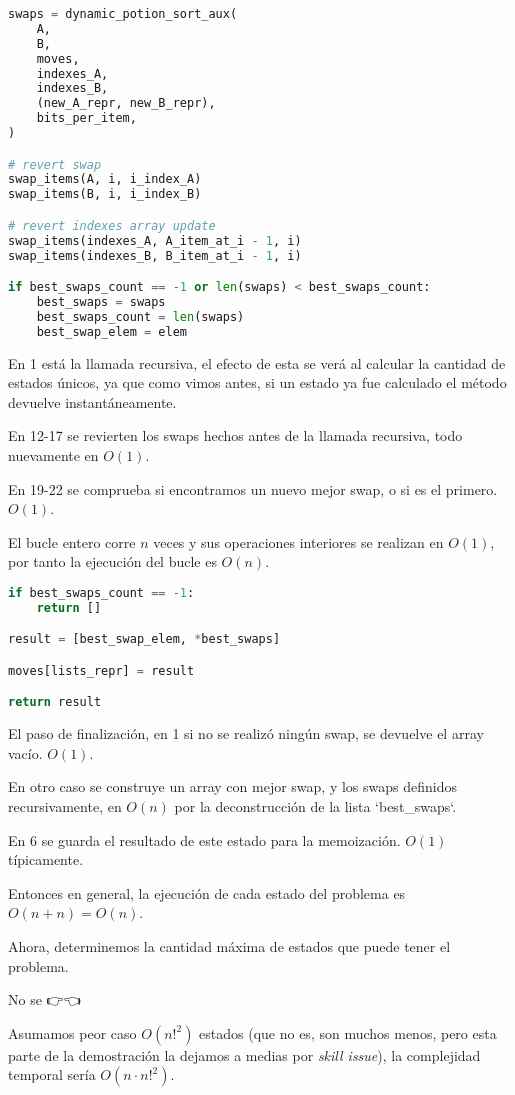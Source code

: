 \documentclass{article}
\begin{document}
\begin{lstlisting}[language=Python]
swaps = dynamic_potion_sort_aux(
    A,
    B,
    moves,
    indexes_A,
    indexes_B,
    (new_A_repr, new_B_repr),
    bits_per_item,
)

# revert swap
swap_items(A, i, i_index_A)
swap_items(B, i, i_index_B)

# revert indexes array update
swap_items(indexes_A, A_item_at_i - 1, i)
swap_items(indexes_B, B_item_at_i - 1, i)

if best_swaps_count == -1 or len(swaps) < best_swaps_count:
    best_swaps = swaps
    best_swaps_count = len(swaps)
    best_swap_elem = elem
\end{lstlisting}

En 1 está la llamada recursiva, el efecto de esta se verá al calcular la cantidad de estados únicos, ya que como vimos antes, si un estado ya fue calculado el método devuelve instantáneamente.

En 12-17 se revierten los swaps hechos antes de la llamada recursiva, todo nuevamente en $O(1)$.

En 19-22 se comprueba si encontramos un nuevo mejor swap, o si es el primero. $O(1)$.

El bucle entero corre $n$ veces y sus operaciones interiores se realizan en $O(1)$, por tanto la ejecución del bucle es $O(n)$.

\begin{lstlisting}[language=Python]
if best_swaps_count == -1:
    return []

result = [best_swap_elem, *best_swaps]

moves[lists_repr] = result

return result
\end{lstlisting}

El paso de finalización, en 1 si no se realizó ningún swap, se devuelve el array vacío. $O(1)$.

En otro caso se construye un array con mejor swap, y los swaps definidos recursivamente, en $O(n)$ por la deconstrucción de la lista `best_swaps`.

En 6 se guarda el resultado de este estado para la memoización. $O(1)$ típicamente.

Entonces en general, la ejecución de cada estado del problema es $O(n + n) = O(n)$.

Ahora, determinemos la cantidad máxima de estados que puede tener el problema.

No se 👉👈

Asumamos peor caso $O(n!^2)$ estados (que no es, son muchos menos, pero esta parte de la demostración la dejamos a medias por \textit{skill issue}), la complejidad temporal sería $O(n \cdot n!^2)$.
\end{document}
